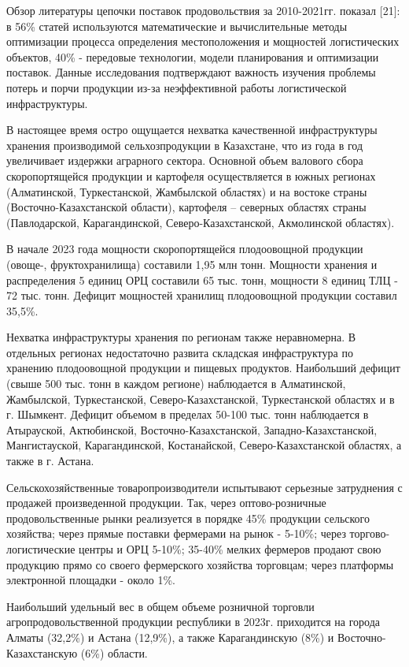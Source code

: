 \begin{multicols}{2}
Обзор литературы цепочки поставок продовольствия за 2010-2021гг. показал
{[}21{]}: в 56\% статей используются математические и вычислительные
методы оптимизации процесса определения местоположения и мощностей
логистических объектов, 40\% - передовые технологии, модели планирования
и оптимизации поставок. Данные исследования подтверждают важность
изучения проблемы потерь и порчи продукции из-за неэффективной работы
логистической инфраструктуры.

В настоящее время остро ощущается нехватка качественной инфраструктуры
хранения производимой сельхозпродукции в Казахстане, что из года в год
увеличивает издержки аграрного сектора. Основной объем валового сбора
скоропортящейся продукции и картофеля осуществляется в южных регионах
(Алматинской, Туркестанской, Жамбылской областях) и на востоке страны
(Восточно-Казахстанской области), картофеля -- северных областях страны
(Павлодарской, Карагандинской, Северо-Казахстанской, Акмолинской
областях).

В начале 2023 года мощности скоропортящейся плодоовощной продукции
(овоще-, фруктохранилища) составили 1,95 млн тонн. Мощности хранения и
распределения 5 единиц ОРЦ составили 65 тыс. тонн, мощности 8 единиц ТЛЦ
- 72 тыс. тонн. Дефицит мощностей хранилищ плодоовощной продукции
составил 35,5\%.

Нехватка инфраструктуры хранения по регионам также неравномерна. В
отдельных регионах недостаточно развита складская инфраструктура по
хранению плодоовощной продукции и пищевых продуктов. Наибольший дефицит
(свыше 500 тыс. тонн в каждом регионе) наблюдается в Алматинской,
Жамбылской, Туркестанской, Северо-Казахстанской, Туркестанской областях
и в г. Шымкент. Дефицит объемом в пределах 50-100 тыс. тонн наблюдается
в Атырауской, Актюбинской, Восточно-Казахстанской,
Западно-Казахстанской, Мангистауской, Карагандинской, Костанайской,
Северо-Казахстанской областях, а также в г. Астана.

Сельскохозяйственные товаропроизводители испытывают серьезные
затруднения с продажей произведенной продукции. Так, через
оптово-розничные продовольственные рынки реализуется в порядке 45\%
продукции сельского хозяйства; через прямые поставки фермерами на рынок
- 5-10\%; через торгово-логистические центры и ОРЦ 5-10\%; 35-40\%
мелких фермеров продают свою продукцию прямо со своего фермерского
хозяйства торговцам; через платформы электронной площадки - около 1\%.

Наибольший удельный вес в общем объеме розничной торговли
агропродовольственной продукции республики в 2023г. приходится на города
Алматы (32,2\%) и Астана (12,9\%), а также Карагандинскую (8\%) и
Восточно-Казахстанскую (6\%) области.


\end{multicols}
